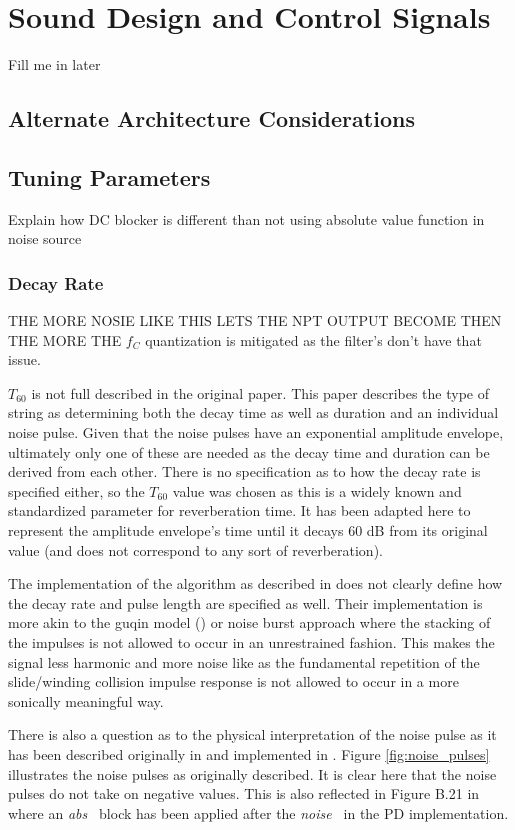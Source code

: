 \documentclass[../main.tex]{subfiles}
\begin{document}
\chapter{Sound Design and Control Signals}
Fill me in later

\section{Alternate Architecture Considerations}
\section{Tuning Parameters}
Explain how DC blocker is different than not using absolute value function in noise source
\subsection{Decay Rate}
THE MORE NOSIE LIKE THIS LETS THE NPT OUTPUT BECOME THEN THE MORE THE $f_C$ quantization is mitigated as the filter's don't have that issue.

$T_{60}$ is not full described in the original  paper. This paper describes the type of string as determining both the decay time as well as duration and an individual noise pulse. Given that the noise pulses have an exponential amplitude envelope, ultimately only one of these are needed as the decay time and duration can be derived from each other. There is no specification as to how the decay rate is specified either, so the $T_{60}$ value was chosen as this is a widely known and standardized parameter for reverberation time. It has been adapted here to represent the amplitude envelope's time until it decays 60 dB from its original value (and does not correspond to any sort of reverberation).

The implementation of the algorithm as described in  does not clearly define how the decay rate and pulse length are specified as well. Their implementation is more akin to the guqin model () or noise burst approach where the stacking of the impulses is not allowed to occur in an unrestrained fashion. This makes the signal less harmonic and more noise like as the fundamental repetition of the slide/winding collision impulse response is not allowed to occur in a more sonically meaningful way.

There is also a question as to the physical interpretation of the noise pulse as it has been described originally in  and implemented in . Figure \ref{fig:noise_pulses} illustrates the noise pulses as originally described. It is clear here that the noise pulses do not take on negative values. This is also reflected in Figure B.21 in  where an \emph{abs~} block has been applied after the \emph{noise~} in the PD implementation.
\end{document}
